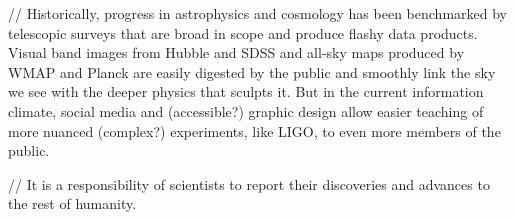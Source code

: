 \documentclass[12pt]{article}
\begin{document}
// Historically, progress in astrophysics and cosmology has been benchmarked by telescopic surveys that are broad in scope and produce flashy data products. Visual band images from Hubble and SDSS and all-sky maps produced by WMAP and Planck are easily digested by the public and smoothly link the sky we see with the deeper physics that sculpts it. But in the current information climate, social media and (accessible?) graphic design allow easier teaching of more nuanced (complex?) experiments, like LIGO, to even more members of the public.

// It is a responsibility of scientists to report their discoveries and advances to the rest of humanity. 
\end{document}
